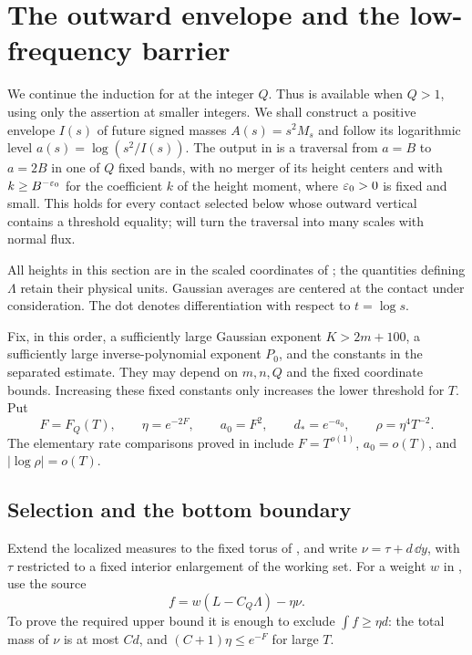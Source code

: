 \section{The outward envelope and the low-frequency barrier}
\label{sec:excess}

We continue the induction for  at the integer \(Q\).
Thus  is available when \(Q>1\), using only the
assertion at smaller integers. We shall construct a positive envelope
\(I(s)\) of future signed masses \(A(s)=s^2M_s\) and follow its
logarithmic level \(a(s)=\log(s^2/I(s))\). The output in
 is a traversal from \(a=B\) to \(a=2B\) in one of
\(Q\) fixed bands, with no merger of its height centers and with
\(k\ge B^{-\varepsilon_0}\) for the coefficient \(k\) of the height moment,
where \(\varepsilon_0>0\) is fixed and small. This holds for every contact
selected below whose outward vertical contains a threshold equality; 
will turn the traversal into many scales with normal flux.

All heights in this section are in the scaled coordinates of
; the quantities defining
\(\Lambda\) retain their physical units. Gaussian averages are centered
at the contact under consideration. The dot denotes differentiation
with respect to \(t=\log s\).

Fix, in this order, a sufficiently large Gaussian exponent \(K>2m+100\),
a sufficiently large inverse-polynomial exponent \(P_0\), and the
constants in the separated estimate. They may depend on \(m,n,Q\) and
the fixed coordinate bounds. Increasing these fixed constants only
increases the lower threshold for \(T\). Put
\begin{equation}
 F=F_Q(T),\qquad \eta=e^{-2F},\qquad
 a_0=F^2,\qquad d_*=e^{-a_0},\qquad \rho=\eta^4T^{-2}.
 \label{ex:parameters}
\end{equation}
The elementary rate comparisons proved in  include
\(F=T^{o(1)}\), \(a_0=o(T)\), and \(|\log\rho|=o(T)\).

\subsection{Selection and the bottom boundary}

Extend the localized measures to the fixed torus of
, and write \(\nu=\tau+d\,\dd y\), with
\(\tau\) restricted to a fixed interior enlargement of the working
set. For a weight \(w\) in , use the source
\begin{equation}
 f=w(L-C_Q\Lambda)-\eta\nu.
 \label{ex:source}
\end{equation}
To prove the required upper bound it is enough to exclude
\(\int f\ge\eta d\): the total mass of \(\nu\) is at most \(Cd\),
and \((C+1)\eta\le e^{-F}\) for large \(T\).

